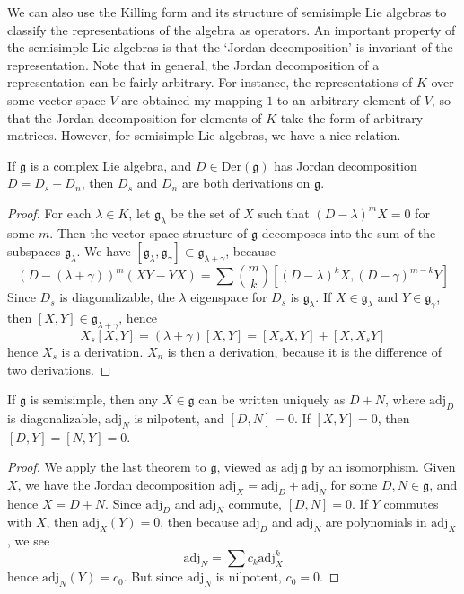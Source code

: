 We can also use the Killing form and its structure of semisimple Lie algebras to classify the representations of the algebra as operators. An important property of the semisimple Lie algebras is that the `Jordan decomposition' is invariant of the representation. Note that in general, the Jordan decomposition of a representation can be fairly arbitrary. For instance, the representations of $K$ over some vector space $V$ are obtained my mapping $1$ to an arbitrary element of $V$, so that the Jordan decomposition for elements of $K$ take the form of arbitrary matrices. However, for semisimple Lie algebras, we have a nice relation.

\begin{lemma}
    If $\mathfrak{g}$ is a complex Lie algebra, and $D \in \text{Der}(\mathfrak{g})$ has Jordan decomposition $D = D_s + D_n$, then $D_s$ and $D_n$ are both derivations on $\mathfrak{g}$.
\end{lemma}
\begin{proof}
    For each $\lambda \in K$, let $\mathfrak{g}_\lambda$ be the set of $X$ such that $(D - \lambda)^mX = 0$ for some $m$. Then the vector space structure of $\mathfrak{g}$ decomposes into the sum of the subspaces $\mathfrak{g}_\lambda$. We have $[\mathfrak{g}_\lambda, \mathfrak{g}_\gamma] \subset \mathfrak{g}_{\lambda + \gamma}$, because
    \[ (D - (\lambda + \gamma))^m(XY - YX) = \sum {m \choose k} [(D - \lambda)^k X, (D - \gamma)^{m-k} Y] \]
    Since $D_s$ is diagonalizable, the $\lambda$ eigenspace for $D_s$ is $\mathfrak{g}_\lambda$. If $X \in \mathfrak{g}_\lambda$ and $Y \in \mathfrak{g}_\gamma$, then $[X,Y] \in \mathfrak{g}_{\lambda + \gamma}$, hence
    \[ X_s[X,Y] = (\lambda + \gamma)[X,Y] = [X_sX, Y] + [X,X_sY] \]
    hence $X_s$ is a derivation. $X_n$ is then a derivation, because it is the difference of two derivations.
\end{proof}

\begin{theorem}
    If $\mathfrak{g}$ is semisimple, then any $X \in \mathfrak{g}$ can be written uniquely as $D + N$, where $\text{adj}_{D}$ is diagonalizable, $\text{adj}_{N}$ is nilpotent, and $[D,N] = 0$. If $[X,Y] = 0$, then $[D,Y] = [N,Y] = 0$.
\end{theorem}
\begin{proof}
    We apply the last theorem to $\mathfrak{g}$, viewed as $\text{adj}\ \mathfrak{g}$ by an isomorphism. Given $X$, we have the Jordan decomposition $\text{adj}_X = \text{adj}_D + \text{adj}_N$ for some $D,N \in \mathfrak{g}$, and hence $X = D + N$. Since $\text{adj}_D$ and $\text{adj}_N$ commute, $[D,N] = 0$. If $Y$ commutes with $X$, then $\text{adj}_X(Y) = 0$, then because $\text{adj}_D$ and $\text{adj}_N$ are polynomials in $\text{adj}_X$, we see
    \[ \text{adj}_N = \sum c_k \text{adj}^k_X \]
    hence $\text{adj}_N(Y) = c_0$. But since $\text{adj}_N$ is nilpotent, $c_0 = 0$.
\end{proof}

